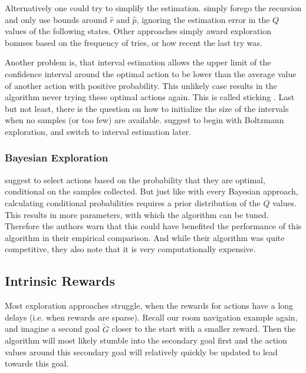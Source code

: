 Alternatively one could try to simplify the estimation. \textcite{wieringEfficientModelbasedExploration1998} simply forego the recursion and only use bounds around \(\hat{r}\) and \(\hat{p}\), ignoring the estimation error in the \(Q\) values of the following states. Other approaches simply award exploration bonuses based on the frequency of tries, or how recent the last try was. 


Another problem is, that interval estimation allows the upper limit of the confidence interval around the optimal action to be lower than the average value of another action with positive probability. This unlikely case results in the algorithm never trying these optimal actions again. This is called sticking \parencite[61]{kaelblingLearningEmbeddedSystems1993}. Last but not least, there is the question on how to initialize the size of the intervals when no samples (or too few) are available. \textcite{wieringEfficientModelbasedExploration1998} suggest to begin with Boltzmann exploration, and switch to interval estimation later. 

\subsubsection{Bayesian Exploration}
\textcite{deardenBayesianQLearning1998} suggest to select actions based on the probability that they are optimal, conditional on the samples collected. But just like with every Bayesian approach, calculating conditional probabilities requires a prior distribution of the \(Q\) values. This results in more parameters, with which the algorithm can be tuned. Therefore the authors warn that this could have benefited the performance of this algorithm in their empirical comparison. And while their algorithm was quite competitive, they also note that it is very computationally expensive.


\subsection{Intrinsic Rewards}
Most exploration approaches struggle, when the rewards for actions have a long delays (i.e. when rewards are sparse). Recall our room navigation example again, and imagine a second goal \(\tilde{G}\) closer to the start with a smaller reward. Then the algorithm will most likely stumble into the secondary goal first and the action values around this secondary goal will relatively quickly be updated to lead towards this goal. 

